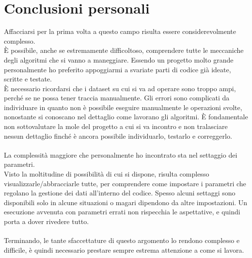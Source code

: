\section*{Conclusioni personali}
Affacciarsi per la prima volta a questo campo risulta essere considerevolmente complesso.\\
È possibile, anche se estremamente difficoltoso, comprendere tutte le meccaniche degli algoritmi che si vanno a maneggiare. Essendo un progetto molto grande personalmente ho preferito appoggiarmi a svariate parti di codice già ideate, scritte e testate.\\
È necessario ricordarsi che i dataset su cui si va ad operare sono troppo ampi, perché se ne possa tener traccia manualmente. Gli errori sono complicati da individuare in quanto non è possibile eseguire manualmente le operazioni svolte, nonostante si conoscano nel dettaglio come lavorano gli algoritmi. È fondamentale non sottovalutare la mole del progetto a cui si va incontro e non tralasciare nessun dettaglio finché è ancora possibile individuarlo, testarlo e correggerlo.\\
\\
La complessità maggiore che personalmente ho incontrato sta nel settaggio dei parametri.\\
Visto la moltitudine di possibilità di cui si dispone, risulta complesso visualizzarle/abbracciarle tutte, per comprendere come impostare i parametri che regolano la gestione dei dati all'interno del codice. Spesso alcuni settaggi sono disponibili solo in alcune situazioni o magari dipendono da altre impostazioni. Un esecuzione avvenuta con parametri errati non rispecchia le aspettative, e quindi porta a dover rivedere tutto.\\
\\
Terminando, le tante sfaccettature di questo argomento lo rendono complesso e difficile, è quindi necessario prestare sempre estrema attenzione a come si lavora.

%




